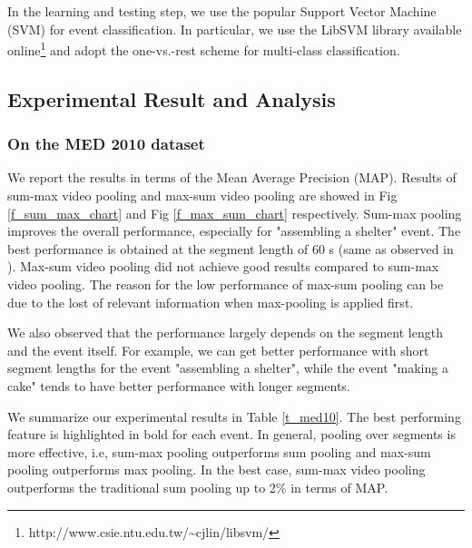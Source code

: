In the learning and testing step, we use the popular Support Vector Machine (SVM) for event classification. In particular, we use the LibSVM library available online\footnote{http://www.csie.ntu.edu.tw/{\textasciitilde}cjlin/libsvm/} and adopt the one-vs.-rest scheme for multi-class classification. 

\subsection{Experimental Result and Analysis}

\subsubsection{On the MED 2010 dataset}
We report the results in terms of the Mean Average Precision (MAP). Results of sum-max video pooling and max-sum video pooling are showed in Fig \ref{f_sum_max_chart} and Fig \ref{f_max_sum_chart} respectively. Sum-max pooling improves the overall performance, especially for "assembling a shelter" event. The best performance is obtained at the segment length of 60 s (same as observed in \cite{DBLP:journals/vlsisp/PhanNLTLDS14}). Max-sum video pooling did not achieve good results compared to sum-max video pooling. The reason for the low performance of max-sum pooling can be due to the lost of relevant information when max-pooling is applied first. 

We also observed that the performance largely depends on the segment length and the event itself. For example, we can get better performance with short segment lengths for the event "assembling a shelter", while the event "making a cake" tends to have better performance with longer segments. 

We summarize our experimental results in Table \ref{t_med10}. The best performing feature is highlighted in bold for each event. In general, pooling over segments is more effective, i.e, sum-max pooling outperforms sum pooling and max-sum pooling outperforms max pooling. In the best case, sum-max video pooling outperforms the traditional sum pooling up to 2\% in terms of MAP.

